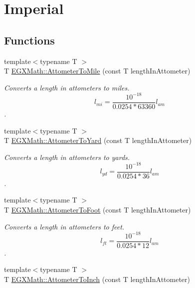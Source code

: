 \hypertarget{group___e_g_x_math-_conversions-_length_conversions-_s_i-_attometer-_imperial}{}\section{Imperial}
\label{group___e_g_x_math-_conversions-_length_conversions-_s_i-_attometer-_imperial}
\subsection*{Functions}
\begin{DoxyCompactItemize}
\item 
{\footnotesize template$<$typename T $>$ }\\T \mbox{\hyperlink{group___e_g_x_math-_conversions-_length_conversions-_s_i-_attometer-_imperial_ga5525f722f588a2bb0a480c56d452fd3f}{E\+G\+X\+Math\+::\+Attometer\+To\+Mile}} (const T length\+In\+Attometer)
\begin{DoxyCompactList}\small\item\em Converts a length in attometers to miles. \[ l_{mi}=\frac{10^{-18}}{0.0254 * 63360} l_{am} \]. \end{DoxyCompactList}\item 
{\footnotesize template$<$typename T $>$ }\\T \mbox{\hyperlink{group___e_g_x_math-_conversions-_length_conversions-_s_i-_attometer-_imperial_gaa88d881301681b0864a866ef45ad041c}{E\+G\+X\+Math\+::\+Attometer\+To\+Yard}} (const T length\+In\+Attometer)
\begin{DoxyCompactList}\small\item\em Converts a length in attometers to yards. \[ l_{yd}= \frac{10^{-18}}{0.0254 * 36} l_{am} \]. \end{DoxyCompactList}\item 
{\footnotesize template$<$typename T $>$ }\\T \mbox{\hyperlink{group___e_g_x_math-_conversions-_length_conversions-_s_i-_attometer-_imperial_gaa4c9d59d58ec5811452592887a0261d9}{E\+G\+X\+Math\+::\+Attometer\+To\+Foot}} (const T length\+In\+Attometer)
\begin{DoxyCompactList}\small\item\em Converts a length in attometers to feet. \[ l_{ft}= \frac{10^{-18}}{0.0254 * 12} l_{am} \]. \end{DoxyCompactList}\item 
{\footnotesize template$<$typename T $>$ }\\T \mbox{\hyperlink{group___e_g_x_math-_conversions-_length_conversions-_s_i-_attometer-_imperial_ga76cb652df52a89284cc3661a670d4990}{E\+G\+X\+Math\+::\+Attometer\+To\+Inch}} (const T length\+In\+Attometer)

\end{DoxyCompactItemize}
